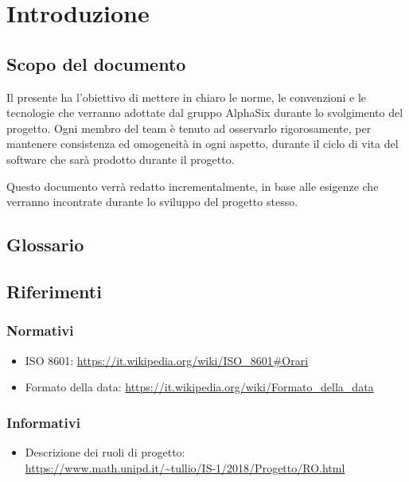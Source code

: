 \section{Introduzione}

\subsection{Scopo del documento}
    Il presente  ha l’obiettivo di mettere in chiaro le norme, le convenzioni e le tecnologie
    che verranno adottate dal gruppo AlphaSix durante lo svolgimento del progetto\GAlt. Ogni membro del team
    \`e tenuto ad osservarlo rigorosamente, per mantenere consistenza ed omogeneit\`a in ogni aspetto, durante il ciclo di
    vita del software che sarà prodotto durante il progetto.\par
    Questo documento verr\`a redatto incrementalmente, in base alle esigenze che verranno incontrate durante lo sviluppo del
    progetto stesso.


\subsection{Glossario}


\subsection{Riferimenti}

    \subsubsection{Normativi}	\label{rifnorma}
    \begin{itemize}
    	\item ISO 8601: \url{https://it.wikipedia.org/wiki/ISO\_8601#Orari}
    	\item Formato della data: \url{https://it.wikipedia.org/wiki/Formato\_della\_data}
    \end{itemize}

    \subsubsection{Informativi}	\label{rifinfo}
    \begin{itemize}
        \item Descrizione dei ruoli di progetto: \\\url{https://www.math.unipd.it/~tullio/IS-1/2018/Progetto/RO.html}

	\end{itemize}
